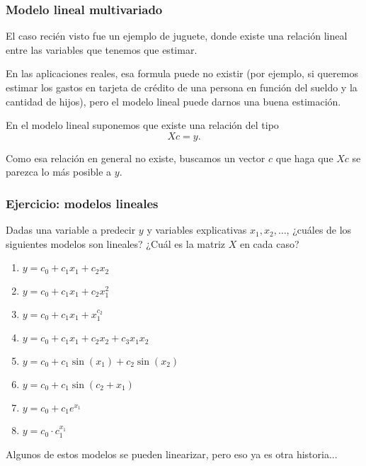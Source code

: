 \documentclass[aspectratio=169,12pt]{beamer}
\begin{document}
\begin{frame}
\frametitle{Modelo lineal multivariado}

El caso recién visto fue un ejemplo de juguete, donde existe una relación lineal entre las variables que tenemos que estimar.

En las aplicaciones reales, esa formula puede no existir (por ejemplo, si queremos estimar los gastos en tarjeta de crédito de una persona en función del sueldo y la cantidad de hijos), pero el modelo lineal puede darnos una buena estimación.

En el modelo lineal suponemos que existe una relación del tipo
$$ X c = y.$$

Como esa relación en general no existe, buscamos un vector $c$ que haga que $X c$ se parezca lo más posible a $y$.

\end{frame}


\begin{frame}
\frametitle{Ejercicio: modelos lineales}

Dadas una variable a predecir $y$ y variables explicativas $x_1, x_2, \dots$, ¿cuáles de los siguientes modelos son lineales? ¿Cuál es la matriz $X$ en cada caso?

\begin{enumerate}
\item $y = c_0 + c_1 x_1 + c_2 x_2$
\item $y = c_0 + c_1 x_1 + c_2 x_1^2$
\item $y = c_0 + c_1 x_1 + x_1^{c_2}$
\item $y = c_0 + c_1 x_1 + c_2 x_2 + c_3 x_1 x_2$
\item $y = c_0 + c_1 \sin(x_1) + c_2 \sin(x_2)$
\item $y = c_0 + c_1 \sin(c_2 + x_1)$
\item $y = c_0 + c_1 e^{x_1}$
\item $y = c_0 \cdot c_1 ^{x_1}$
\end{enumerate}

\pause Algunos de estos modelos se pueden linearizar, pero eso ya es otra historia...
\end{frame}
\end{document}
